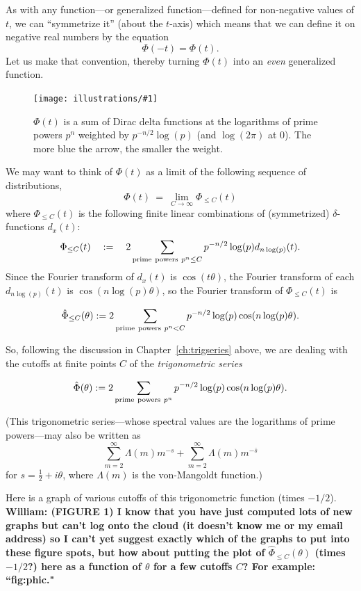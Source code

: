 \documentclass[openany]{book}
\newcommand{\ill}[3]{%
   \begin{figure}[H]%
   \vspace{-2ex}
   \centering%
   \texttt{[image: illustrations/\#1]}%
   \caption{#3}%
   \vspace{-2ex}
    \end{figure}}
\theoremstyle{plain}
\theoremstyle{definition}
\begin{document}
{{As with any function---or generalized function---defined for
non-negative values of $t$, we can ``symmetrize it'' (about the
$t$-axis) which means that we can define it on negative real numbers
by the equation
  $$\Phi(-t) = \Phi(t).$$
  Let us make that convention, thereby turning $\Phi(t)$ into an {\it
    even} generalized function.

\ill{bigPhi}{1}{$\Phi(t)$ is a sum of Dirac delta functions at the logarithms of prime powers $p^n$ weighted by $p^{-n/2}\log(p)$ (and $\log(2\pi)$ at $0$).  The more blue the arrow, the smaller the weight.}


We may want to think of $\Phi(t)$ as a limit of the following sequence of distributions,
 $$\Phi(t)\ = \ \lim_{C \to {\infty}}\Phi_{\le C}(t)$$
where $\Phi_{\le C}(t)$  is the following finite linear
combinations of (symmetrized) $\delta$-functions  $d_x(t)$:
 $$\Phi_{\le C}(t)\quad :=\quad  2\sum_{{\rm prime\ powers \ }p^n  \le C} p^{-n/2}\log(p)d_{n\log(p)}(t).$$
 Since the Fourier transform of $d_x(t)$ is  $\cos(t\theta)$, the Fourier transform of  each $d_{n\log(p)}(t)$ is
 $\cos(n\log(p)\theta)$, so the Fourier transform of $\Phi_{\le
   C}(t)$ is

  $${\hat \Phi}_{\le C}(\theta):= 2\sum_{{\rm prime\ powers\ }p^n <C} p^{-n/2} \log(p)\cos(n\log(p)\theta).$$

   So, following the discussion in Chapter~\ref{ch:trigseries} above, we are dealing with the cutoffs at finite points  $C$  of the {\it trigonometric series}

   $${\hat \Phi}(\theta):= 2\sum_{{\rm prime\ powers\ }p^n } p^{-n/2} \log(p)\cos(n\log(p)\theta).$$

   (This trigonometric series---whose spectral values are the logarithms of prime powers---may also be written as
   $$\sum_{m=2}^{\infty}\Lambda(m)m^{-s} + \sum_{m=2}^{\infty}\Lambda(m)m^{-{\bar s}}$$ for $s={\frac{1}{2}}+i\theta$, where  $\Lambda(m)$ is the von-Mangoldt function.)

   Here is a graph of various cutoffs of this trigonometric function (times $-1/2$).
   \vskip20pt
{\bf William: (FIGURE 1) I know that you have just computed lots of new graphs but can't log onto the cloud (it doesn't know me or my email address) so I can't yet suggest exactly which of the graphs to put into these figure spots, but how about putting the plot of ${\hat \Phi}_{\le C}(\theta)$ (times $-1/2$?) here as a function of $\theta$ for a few cutoffs $C$? For example: ``fig:phic."}

}}
\end{document}
